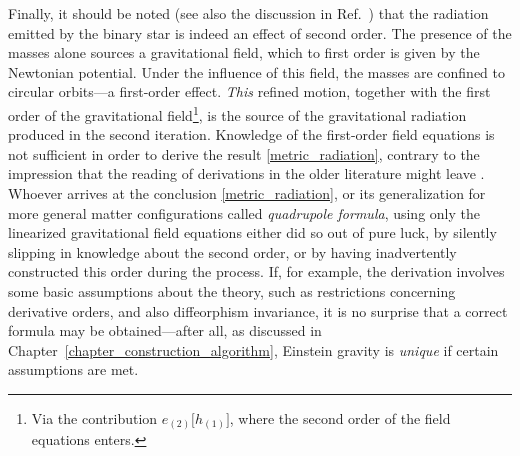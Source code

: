Finally, it should be noted (see also the discussion in Ref.\ \cite{poisson2014gravity}) that the radiation emitted by the binary star is indeed an effect of second order. The presence of the masses alone sources a gravitational field, which to first order is given by the Newtonian potential. Under the influence of this field, the masses are confined to circular orbits---a first-order effect. \emph{This} refined motion, together with the first order of the gravitational field\footnote{Via the contribution $e_{(2)}\lbrack h_{(1)}\rbrack$, where the second order of the field equations enters.}, is the source of the gravitational radiation produced in the second iteration. Knowledge of the first-order field equations is not sufficient in order to derive the result \eqref{metric_radiation}, contrary to the impression that the reading of derivations in the older literature might leave \cite{Misner_1973}. Whoever arrives at the conclusion \eqref{metric_radiation}, or its generalization for more general matter configurations called \emph{quadrupole formula}, using only the linearized gravitational field equations either did so out of pure luck, by silently slipping in knowledge about the second order, or by having inadvertently constructed this order during the process. If, for example, the derivation involves some basic assumptions about the theory, such as restrictions concerning derivative orders, and also diffeorphism invariance, it is no surprise that a correct formula may be obtained---after all, as discussed in Chapter~\ref{chapter_construction_algorithm}, Einstein gravity is \emph{unique} if certain assumptions are met.

